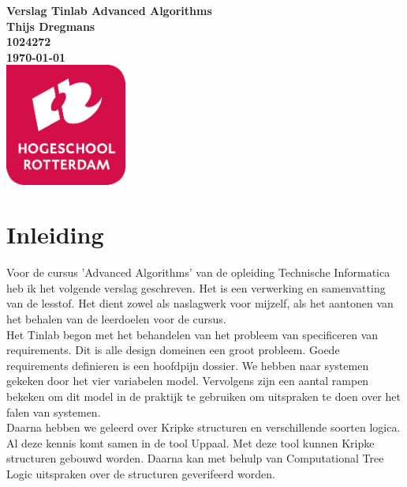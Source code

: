 \documentclass{article}
\begin{document}
	\sffamily
	
	\begin{titlepage}
	
		\centering
		  \vfill
		  {\bfseries\Huge
		    Verslag Tinlab Advanced Algorithms \\
		      \vskip2cm
		    }
		    {\bfseries\Large
		      Thijs Dregmans\\
		    }
		    {
		      \bfseries\normalsize
		      1024272\\
		      \vskip1cm
		      \today\\
		  }    
		  \vfill
		  \includegraphics[width=4cm]{logohr.png} %
		  \vfill
		  \vfill
	    
	\end{titlepage}
	
	\newpage
	
	
	\tableofcontents
	
	\newpage
	
	
	\section{Inleiding}
	
	Voor de cursus 'Advanced Algorithms' van de opleiding Technische Informatica heb ik het volgende verslag geschreven. Het is een verwerking en samenvatting van de lesstof. Het dient zowel als naslagwerk voor mijzelf, als het aantonen van het behalen van de leerdoelen voor de cursus. \\	
	Het Tinlab begon met het behandelen van het probleem van specificeren van requirements. Dit is alle design domeinen een groot probleem. Goede requirements definieren is een hoofdpijn dossier. We hebben naar systemen gekeken door het vier variabelen model. Vervolgens zijn een aantal rampen bekeken om dit model in de praktijk te gebruiken om uitspraken te doen over het falen van systemen.  \\
	Daarna hebben we geleerd over Kripke structuren en verschillende soorten logica. Al deze kennis komt samen in de tool Uppaal. Met deze tool kunnen Kripke structuren gebouwd worden. Daarna kan met behulp van Computational Tree Logic uitspraken over de structuren geverifeerd worden.
	
\end{document}
